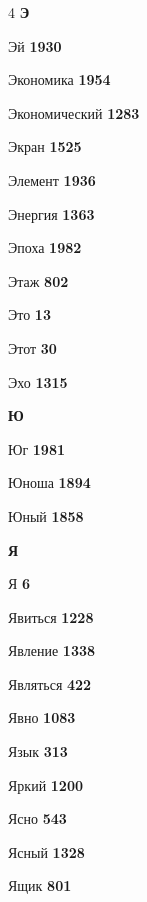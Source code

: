 \begin{multicols}{4}
\vspace{0.6em}\noindent\textbf{\normalsize\sffamily\color{primary} Э}\par\vspace{0.2em}
\noindent Эй \dotfill \textbf{\color{secondary} 1930}\par
\noindent Экономика \dotfill \textbf{\color{secondary} 1954}\par
\noindent Экономический \dotfill \textbf{\color{secondary} 1283}\par
\noindent Экран \dotfill \textbf{\color{secondary} 1525}\par
\noindent Элемент \dotfill \textbf{\color{secondary} 1936}\par
\noindent Энергия \dotfill \textbf{\color{secondary} 1363}\par
\noindent Эпоха \dotfill \textbf{\color{secondary} 1982}\par
\noindent Этаж \dotfill \textbf{\color{secondary} 802}\par
\noindent Это \dotfill \textbf{\color{secondary} 13}\par
\noindent Этот \dotfill \textbf{\color{secondary} 30}\par
\noindent Эхо \dotfill \textbf{\color{secondary} 1315}\par

\vspace{0.6em}\noindent\textbf{\normalsize\sffamily\color{primary} Ю}\par\vspace{0.2em}
\noindent Юг \dotfill \textbf{\color{secondary} 1981}\par
\noindent Юноша \dotfill \textbf{\color{secondary} 1894}\par
\noindent Юный \dotfill \textbf{\color{secondary} 1858}\par

\vspace{0.6em}\noindent\textbf{\normalsize\sffamily\color{primary} Я}\par\vspace{0.2em}
\noindent Я \dotfill \textbf{\color{secondary} 6}\par
\noindent Явиться \dotfill \textbf{\color{secondary} 1228}\par
\noindent Явление \dotfill \textbf{\color{secondary} 1338}\par
\noindent Являться \dotfill \textbf{\color{secondary} 422}\par
\noindent Явно \dotfill \textbf{\color{secondary} 1083}\par
\noindent Язык \dotfill \textbf{\color{secondary} 313}\par
\noindent Яркий \dotfill \textbf{\color{secondary} 1200}\par
\noindent Ясно \dotfill \textbf{\color{secondary} 543}\par
\noindent Ясный \dotfill \textbf{\color{secondary} 1328}\par
\noindent Ящик \dotfill \textbf{\color{secondary} 801}\par
\end{multicols}
